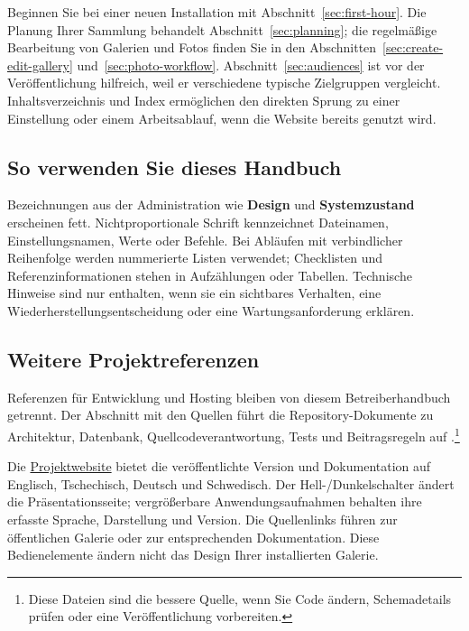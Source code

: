 \documentclass[11pt,a4paper]{article}
\newcommand{\ui}[1]{\textbf{#1}}
\begin{document}
Beginnen Sie bei einer neuen Installation mit Abschnitt~\ref{sec:first-hour}.
Die Planung Ihrer Sammlung behandelt Abschnitt~\ref{sec:planning}; die
regelmäßige Bearbeitung von Galerien und Fotos finden Sie in den
Abschnitten~\ref{sec:create-edit-gallery} und~\ref{sec:photo-workflow}.
Abschnitt~\ref{sec:audiences} ist vor der Veröffentlichung hilfreich, weil er
verschiedene typische Zielgruppen vergleicht. Inhaltsverzeichnis und Index
ermöglichen den direkten Sprung zu einer Einstellung oder einem Arbeitsablauf,
wenn die Website bereits genutzt wird.





\subsection{So verwenden Sie dieses Handbuch}

Bezeichnungen aus der Administration wie \ui{Design} und \ui{Systemzustand}
erscheinen fett. Nichtproportionale Schrift kennzeichnet Dateinamen,
Einstellungsnamen, Werte oder Befehle. Bei Abläufen mit verbindlicher
Reihenfolge werden nummerierte Listen verwendet; Checklisten und
Referenzinformationen stehen in Aufzählungen oder Tabellen. Technische Hinweise
sind nur enthalten, wenn sie ein sichtbares Verhalten, eine
Wiederherstellungsentscheidung oder eine Wartungsanforderung erklären.

\subsection{Weitere Projektreferenzen}

Referenzen für Entwicklung und Hosting bleiben von diesem Betreiberhandbuch
getrennt. Der Abschnitt mit den Quellen führt die Repository-Dokumente zu
Architektur, Datenbank, Quellcodeverantwortung, Tests und Beitragsregeln auf
\cite{readme,architecture,database,codemap,testing,agents}.\footnote{Diese
Dateien sind die bessere Quelle, wenn Sie Code ändern, Schemadetails prüfen oder
eine Veröffentlichung vorbereiten.}

Die \href{https://phpgallery.site/}{Projektwebsite} bietet
die veröffentlichte Version und Dokumentation auf Englisch, Tschechisch,
Deutsch und Schwedisch. Der Hell-/Dunkelschalter ändert die Präsentationsseite;
vergrößerbare Anwendungsaufnahmen behalten ihre erfasste Sprache,
Darstellung und Version. Die Quellenlinks führen zur öffentlichen Galerie
oder zur entsprechenden Dokumentation. Diese Bedienelemente ändern nicht
das Design Ihrer installierten Galerie.
\end{document}
